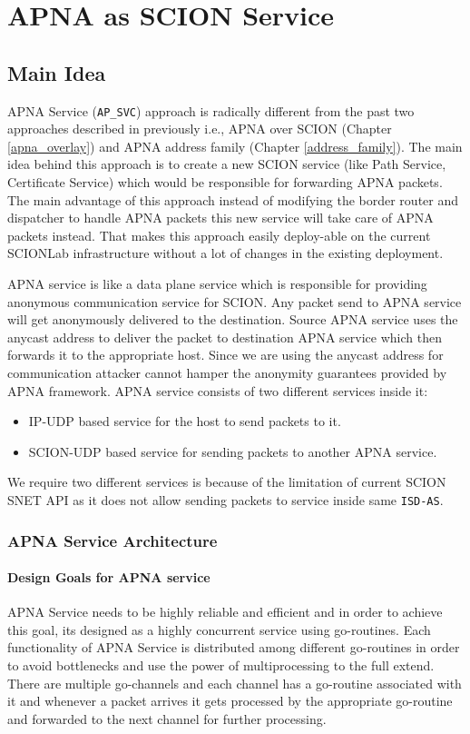 
\chapter{APNA as SCION Service} %

\label{apna_service}

\section{Main Idea}
APNA Service (\texttt{AP\_SVC}) approach is radically different from the past two approaches described in previously i.e., APNA over SCION (Chapter \ref{apna_overlay}) and APNA address family (Chapter \ref{address_family}). The main idea behind this approach is to create a new SCION service (like Path Service, Certificate Service) which would be responsible for forwarding APNA packets. The main advantage of this approach instead of modifying the border router and dispatcher to handle APNA packets this new service will take care of APNA packets instead. That makes this approach easily deploy-able on the current SCIONLab infrastructure without a lot of changes in the existing deployment.

APNA service is like a data plane service which is responsible for providing anonymous communication service for SCION. Any packet send to APNA service will get anonymously delivered to the destination. Source APNA service uses the anycast address to deliver the packet to destination APNA service which then forwards it to the appropriate host. Since we are using the anycast address for communication attacker cannot hamper the anonymity guarantees provided by APNA framework. APNA service consists of two different services inside it:
\begin{itemize}
    \item IP-UDP based service for the host to send packets to it.
    \item SCION-UDP based service for sending packets to another APNA service.
\end{itemize}
We require two different services is because of the limitation of current SCION SNET API as it does not allow sending packets to service inside same \texttt{ISD-AS}.

\subsection{APNA Service Architecture}
\subsubsection{Design Goals for APNA service}
APNA Service needs to be highly reliable and efficient and in order to achieve this goal, its designed as a highly concurrent service using go-routines. Each functionality of APNA Service is distributed among different go-routines in order to avoid bottlenecks and use the power of multiprocessing to the full extend. There are multiple go-channels and each channel has a go-routine associated with it and whenever a packet arrives it gets processed by the appropriate go-routine and forwarded to the next channel for further processing.

